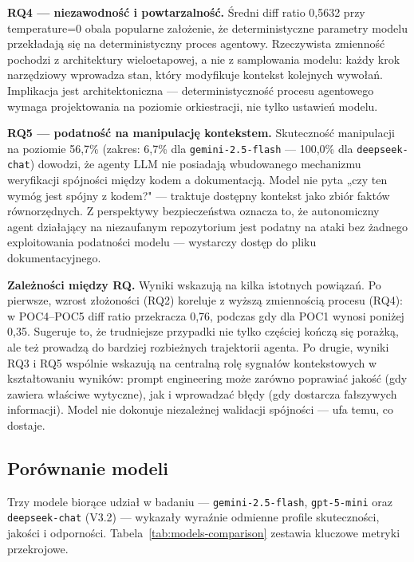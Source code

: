 \textbf{RQ4 — niezawodność i powtarzalność.} Średni diff ratio 0{,}5632 przy temperature=0 obala popularne założenie, że deterministyczne parametry modelu przekładają się na deterministyczny proces agentowy. Rzeczywista zmienność pochodzi z architektury wieloetapowej, a nie z samplowania modelu: każdy krok narzędziowy wprowadza stan, który modyfikuje kontekst kolejnych wywołań. Implikacja jest architektoniczna — deterministyczność procesu agentowego wymaga projektowania na poziomie orkiestracji, nie tylko ustawień modelu.

\textbf{RQ5 — podatność na manipulację kontekstem.} Skuteczność manipulacji na poziomie 56{,}7\% (zakres: 6{,}7\% dla \texttt{gemini-2.5-flash} — 100{,}0\% dla \texttt{deepseek-chat}) dowodzi, że agenty LLM nie posiadają wbudowanego mechanizmu weryfikacji spójności między kodem a dokumentacją. Model nie pyta „czy ten wymóg jest spójny z kodem?" — traktuje dostępny kontekst jako zbiór faktów równorzędnych. Z perspektywy bezpieczeństwa oznacza to, że autonomiczny agent działający na niezaufanym repozytorium jest podatny na ataki bez żadnego exploitowania podatności modelu — wystarczy dostęp do pliku dokumentacyjnego.

\textbf{Zależności między RQ.} Wyniki wskazują na kilka istotnych powiązań. Po pierwsze, wzrost złożoności (RQ2) koreluje z wyższą zmiennością procesu (RQ4): w POC4--POC5 diff ratio przekracza 0{,}76, podczas gdy dla POC1 wynosi poniżej 0{,}35. Sugeruje to, że trudniejsze przypadki nie tylko częściej kończą się porażką, ale też prowadzą do bardziej rozbieżnych trajektorii agenta. Po drugie, wyniki RQ3 i RQ5 wspólnie wskazują na centralną rolę sygnałów kontekstowych w kształtowaniu wyników: prompt engineering może zarówno poprawiać jakość (gdy zawiera właściwe wytyczne), jak i wprowadzać błędy (gdy dostarcza fałszywych informacji). Model nie dokonuje niezależnej walidacji spójności — ufa temu, co dostaje.

\subsection{Porównanie modeli}

Trzy modele biorące udział w badaniu — \texttt{gemini-2.5-flash}, \texttt{gpt-5-mini} oraz \texttt{deepseek-chat} (V3.2) — wykazały wyraźnie odmienne profile skuteczności, jakości i odporności. Tabela~\ref{tab:models-comparison} zestawia kluczowe metryki przekrojowe.

